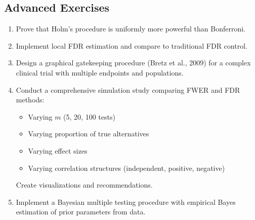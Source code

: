 \subsection{Advanced Exercises}

\begin{enumerate}
    \item Prove that Holm's procedure is uniformly more powerful than Bonferroni.

    \item Implement local FDR estimation and compare to traditional FDR control.

    \item Design a graphical gatekeeping procedure (Bretz et al., 2009) for a complex clinical trial with multiple endpoints and populations.

    \item Conduct a comprehensive simulation study comparing FWER and FDR methods:
    \begin{itemize}
        \item Varying $m$ (5, 20, 100 tests)
        \item Varying proportion of true alternatives
        \item Varying effect sizes
        \item Varying correlation structures (independent, positive, negative)
    \end{itemize}
    Create visualizations and recommendations.

    \item Implement a Bayesian multiple testing procedure with empirical Bayes estimation of prior parameters from data.
\end{enumerate}
